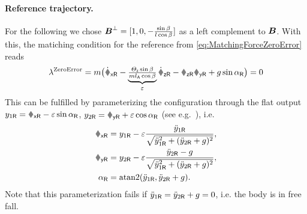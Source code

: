 
\paragraph{Reference trajectory.}
For the following we chose $\boldsymbol{B}^\bot = [1, 0, -\tfrac{\sin\beta}{l \cos\beta}]$ as a left complement to $\boldsymbol{B}$.
With this, the matiching condition for the reference from \eqref{eq:MatchingForceZeroError} reads
\begin{align}
 \lambda^{\text{ZeroError}} = \m \big(\vRxd - \underbrace{\tfrac{\Jz \sin\beta}{\m \ArmRadius \cos\beta}}_{\eps} \wRzd - \wRz \vRy + \gravityAccConst \sin\tiltAngleR \big) = 0
\end{align}
This can be fulfilled by parameterizing the configuration through the flat output $y_{1\idxRef} = \rRx - \eps \sin\tiltAngleR$, $y_{2\idxRef} = \rRy + \eps \cos\tiltAngleR$ (see e.g.\ \cite{Fliess:LieBacklund}), i.e.
\begin{align}
 \rxR &= y_{1\idxRef} - \eps \frac{\ddot{y}_{1\idxRef}}{\sqrt{\ddot{y}_{1\idxRef}^2 + (\ddot{y}_{2\idxRef}+\gravityAccConst)^2}},
\\
 \ryR &= y_{2\idxRef} - \eps \frac{\ddot{y}_{2\idxRef}-\gravityAccConst}{\sqrt{\ddot{y}_{1\idxRef}^2 + (\ddot{y}_{2\idxRef}+\gravityAccConst)^2}},
\\
 \tiltAngle_{\idxRef} &= \atanTwo(\ddot{y}_{1\idxRef}, \ddot{y}_{2\idxRef}+\gravityAccConst).
\end{align}
Note that this parameterization fails if $\ddot{y}_{1\mathsf{R}} = \ddot{y}_{2\mathsf{R}}+g = 0$, i.e. the body is in free fall.

